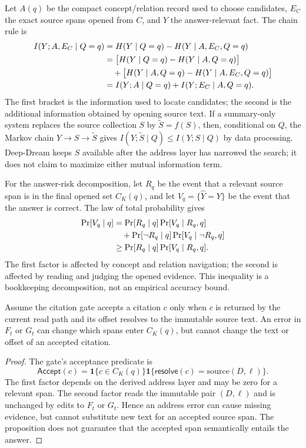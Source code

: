 Let $A(q)$ be the compact concept/relation record used to choose candidates, $E_C$ the exact source spans opened from $C$, and $Y$ the answer-relevant fact. The chain rule is
\begin{align}
I(Y;A,E_C\mid Q=q)
&=H(Y\mid Q=q)-H(Y\mid A,E_C,Q=q)\notag\\
&=\bigl[H(Y\mid Q=q)-H(Y\mid A,Q=q)\bigr]\notag\\
&\quad+\bigl[H(Y\mid A,Q=q)-H(Y\mid A,E_C,Q=q)\bigr]\notag\\
&=I(Y;A\mid Q=q)+I(Y;E_C\mid A,Q=q).
\label{eq:appendix-two-rate}
\end{align}
The first bracket is the information used to locate candidates; the second is the additional information obtained by opening source text. If a summary-only system replaces the source collection $S$ by $\widetilde S=f(S)$, then, conditional on $Q$, the Markov chain $Y\to S\to\widetilde S$ gives $I(Y;\widetilde S\mid Q)\le I(Y;S\mid Q)$ by data processing. Deep-Dream keeps $S$ available after the address layer has narrowed the search; it does not claim to maximize either mutual information term.

For the answer-risk decomposition, let $R_q$ be the event that a relevant source span is in the final opened set $C_K(q)$, and let $V_q=\{\widehat Y=Y\}$ be the event that the answer is correct. The law of total probability gives
\begin{align}
\Pr[V_q\mid q]
&=\Pr[R_q\mid q]\Pr[V_q\mid R_q,q]\notag\\
&\quad+\Pr[\neg R_q\mid q]\Pr[V_q\mid\neg R_q,q]\notag\\
&\ge \Pr[R_q\mid q]\Pr[V_q\mid R_q,q].
\label{eq:appendix-answer-bound}
\end{align}
The first factor is affected by concept and relation navigation; the second is affected by reading and judging the opened evidence. This inequality is a bookkeeping decomposition, not an empirical accuracy bound.

\begin{proposition}
\label{prop:one-sided}
Assume the citation gate accepts a citation $c$ only when $c$ is returned by the current read path and its offset resolves to the immutable source text. An error in $F_t$ or $G_t$ can change which spans enter $C_K(q)$, but cannot change the text or offset of an accepted citation.
\end{proposition}

\begin{proof}
The gate's acceptance predicate is
\[
\mathsf{Accept}(c)=
\mathbf 1\{c\in C_K(q)\}
\mathbf 1\{\mathsf{resolve}(c)=\mathrm{source}(D,\ell)\}.
\]
The first factor depends on the derived address layer and may be zero for a relevant span. The second factor reads the immutable pair $(D,\ell)$ and is unchanged by edits to $F_t$ or $G_t$. Hence an address error can cause missing evidence, but cannot substitute new text for an accepted source span. The proposition does not guarantee that the accepted span semantically entails the answer.
\end{proof}

